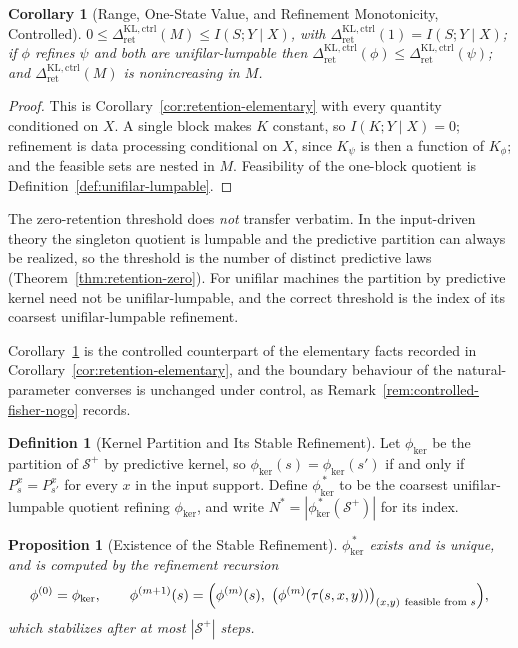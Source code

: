 \documentclass[12pt]{article}
\newtheorem{proposition}[theorem]{Proposition}
\newtheorem{corollary}[theorem]{Corollary}
\theoremstyle{definition}
\newtheorem{definition}[theorem]{Definition}
\newcommand{\Splus}{\mathcal S^{+}}
\newcommand{\RetKLc}{\Delta_{\mathrm{ret}}^{\mathrm{KL,ctrl}}}
\begin{document}
\begin{corollary}[Range, One-State Value, and Refinement Monotonicity, Controlled]
\label{cor:controlled-elementary}
$0\le\RetKLc(M)\le I(S;Y\mid X)$, with
$\RetKLc(1)=I(S;Y\mid X)$; if $\phi$ refines $\psi$ and both are
unifilar-lumpable then
$\RetKLc(\phi)\le\RetKLc(\psi)$; and
$\RetKLc(M)$ is nonincreasing in $M$.
\end{corollary}

\begin{proof}
This is Corollary~\ref{cor:retention-elementary} with every quantity
conditioned on $X$.  A single block makes $K$ constant, so $I(K;Y\mid X)=0$;
refinement is data processing conditional on $X$, since $K_\psi$ is then a
function of $K_\phi$; and the feasible sets are nested in $M$.  Feasibility of
the one-block quotient is Definition~\ref{def:unifilar-lumpable}.
\end{proof}

The zero-retention threshold does \emph{not} transfer verbatim.  In the
input-driven theory the singleton quotient is lumpable and the predictive
partition can always be realized, so the threshold is the number of distinct
predictive laws (Theorem~\ref{thm:retention-zero}).  For unifilar machines the
partition by predictive kernel need not be unifilar-lumpable, and the correct
threshold is the index of its coarsest unifilar-lumpable refinement.

Corollary~\ref{cor:controlled-elementary} is the controlled counterpart of the
elementary facts recorded in Corollary~\ref{cor:retention-elementary}, and the
boundary behaviour of the natural-parameter converses is unchanged under
control, as Remark~\ref{rem:controlled-fisher-nogo} records.

\begin{definition}[Kernel Partition and Its Stable Refinement]
\label{def:kernel-refinement}
Let $\phi_{\ker}$ be the partition of $\Splus$ by predictive kernel, so
$\phi_{\ker}(s)=\phi_{\ker}(s')$ if and only if $P_s^x=P_{s'}^x$ for every $x$
in the input support.  Define $\phi_{\ker}^{\,\ast}$ to be the coarsest
unifilar-lumpable quotient refining $\phi_{\ker}$, and write
$N^{\ast}=|\phi_{\ker}^{\,\ast}(\Splus)|$ for its index.
\end{definition}

\begin{proposition}[Existence of the Stable Refinement]
\label{prop:kernel-refinement-exists}
$\phi_{\ker}^{\,\ast}$ exists and is unique, and is computed by the refinement
recursion
\[
\phi^{(0)}=\phi_{\ker},
\qquad
\phi^{(m+1)}(s)
=
\Bigl(\phi^{(m)}(s),\ \bigl(\phi^{(m)}(\tau(s,x,y))\bigr)_{(x,y)\ \text{feasible from }s}\Bigr),
\]
which stabilizes after at most $|\Splus|$ steps.
\end{proposition}
\end{document}
